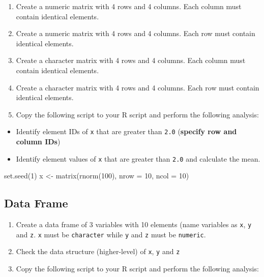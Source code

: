 \documentclass[
]{book}
\newenvironment{Shaded}{\begin{snugshade}}{\end{snugshade}}
\newcommand{\AttributeTok}[1]{\textcolor[rgb]{0.77,0.63,0.00}{#1}}
\newcommand{\DecValTok}[1]{\textcolor[rgb]{0.00,0.00,0.81}{#1}}
\newcommand{\FunctionTok}[1]{\textcolor[rgb]{0.00,0.00,0.00}{#1}}
\newcommand{\NormalTok}[1]{#1}
\newcommand{\OtherTok}[1]{\textcolor[rgb]{0.56,0.35,0.01}{#1}}
\providecommand{\tightlist}{%
  \setlength{\itemsep}{0pt}\setlength{\parskip}{0pt}}
\begin{document}
\begin{enumerate}
\def\labelenumi{\alph{enumi}.}
\tightlist
\item
  Create a numeric matrix with 4 rows and 4 columns. Each column must contain identical elements.
\item
  Create a numeric matrix with 4 rows and 4 columns. Each row must contain identical elements.
\item
  Create a character matrix with 4 rows and 4 columns. Each column must contain identical elements.
\item
  Create a character matrix with 4 rows and 4 columns. Each row must contain identical elements.
\item
  Copy the following script to your R script and perform the following analysis:
\end{enumerate}

\begin{itemize}
\tightlist
\item
  Identify element IDs of \texttt{x} that are greater than \texttt{2.0} (\textbf{specify row and column IDs})
\item
  Identify element values of \texttt{x} that are greater than \texttt{2.0} and calculate the mean.
\end{itemize}

\begin{Shaded}
\begin{Highlighting}[]
\FunctionTok{set.seed}\NormalTok{(}\DecValTok{1}\NormalTok{)}
\NormalTok{x }\OtherTok{\textless{}{-}} \FunctionTok{matrix}\NormalTok{(}\FunctionTok{rnorm}\NormalTok{(}\DecValTok{100}\NormalTok{), }\AttributeTok{nrow =} \DecValTok{10}\NormalTok{, }\AttributeTok{ncol =} \DecValTok{10}\NormalTok{)}
\end{Highlighting}
\end{Shaded}

\hypertarget{data-frame-1}{%
\subsection{Data Frame}\label{data-frame-1}}

\begin{enumerate}
\def\labelenumi{\alph{enumi}.}
\tightlist
\item
  Create a data frame of 3 variables with 10 elements (name variables as \texttt{x}, \texttt{y} and \texttt{z}. \texttt{x} must be \texttt{character} while \texttt{y} and \texttt{z} must be \texttt{numeric}.
\item
  Check the data structure (higher-level) of \texttt{x}, \texttt{y} and \texttt{z}
\item
  Copy the following script to your R script and perform the following analysis:
\end{enumerate}
\end{document}

